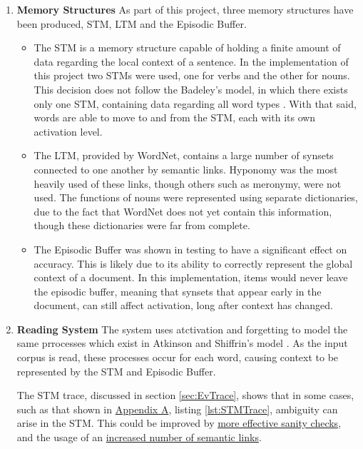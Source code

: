 \documentclass[]{article}
\begin{document}
\begin{enumerate}
	\item \textbf{Memory Structures} \newline
		As part of this project, three memory structures have been produced, STM, LTM and the Episodic Buffer.
		\begin{itemize}
			\item The STM is a memory structure capable of holding a finite amount of data regarding the local context of a sentence. In the implementation of this project two STMs were used, one for verbs and the other for nouns. This decision does not follow the Badeley's model, in which there exists only one STM, containing data regarding all word types \cite{MemoryBaddeleyEysenkAnderson}. With that said, words are able to move to and from the STM, each with its own activation level.
			
			\item The LTM, provided by WordNet, contains a large number of synsets connected to one another by semantic links. Hyponomy was the most heavily used of these links, though others such as meronymy, were not used. The functions of nouns were represented using separate dictionaries, due to the fact that WordNet does not yet contain this information, though these dictionaries were far from complete.
			
			\item The Episodic Buffer was shown in testing to have a significant effect on accuracy. This is likely due to its ability to correctly represent the global context of a document. In this implementation, items would never leave the episodic buffer, meaning that synsets that appear early in the document, can still affect activation, long after context has changed.
		\end{itemize}		 
		
	\item \textbf{Reading System} \newline
		The system uses atctivation and forgetting to model the same prrocesses which exist in Atkinson and Shiffrin's model \cite{ControlProcessesSTMAtkinson}. As the input corpus is read, these processes occur for each word, causing context to be represented by the STM and Episodic Buffer. 
		
		The STM trace, discussed in section \ref{sec:EvTrace}, shows that in some cases, such as that shown in \hyperref[sec:AppA]{Appendix A}, listing \ref{lst:STMTrace}, ambiguity can arise in the STM. This could be improved by \hyperref[sec:FutureSemantic]{more effective sanity checks}, and the usage of an \hyperref[sec:FutureSemantic]{increased number of semantic links}.
	

\end{enumerate}
\end{document}
